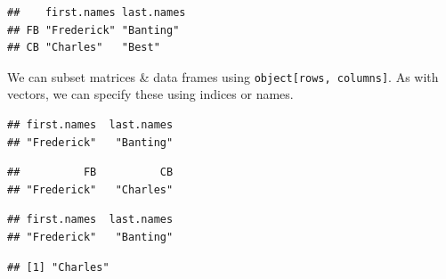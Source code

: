 \documentclass[]{article}
\newenvironment{Shaded}{\begin{snugshade}}{\end{snugshade}}
\newcommand{\DecValTok}[1]{\textcolor[rgb]{0.00,0.00,0.81}{#1}}
\newcommand{\StringTok}[1]{\textcolor[rgb]{0.31,0.60,0.02}{#1}}
\newcommand{\CommentTok}[1]{\textcolor[rgb]{0.56,0.35,0.01}{\textit{#1}}}
\newcommand{\NormalTok}[1]{#1}
\begin{document}
\begin{verbatim}
##    first.names last.names
## FB "Frederick" "Banting" 
## CB "Charles"   "Best"
\end{verbatim}

We can subset matrices \& data frames using
\texttt{object{[}rows,\ columns{]}}. As with vectors, we can specify
these using indices or names.

\begin{Shaded}
\end{Shaded}

\begin{verbatim}
## first.names  last.names 
## "Frederick"   "Banting"
\end{verbatim}

\begin{Shaded}
\end{Shaded}

\begin{verbatim}
##          FB          CB 
## "Frederick"   "Charles"
\end{verbatim}

\begin{Shaded}
\end{Shaded}

\begin{verbatim}
## first.names  last.names 
## "Frederick"   "Banting"
\end{verbatim}

\begin{Shaded}
\end{Shaded}

\begin{verbatim}
## [1] "Charles"
\end{verbatim}
\end{document}
